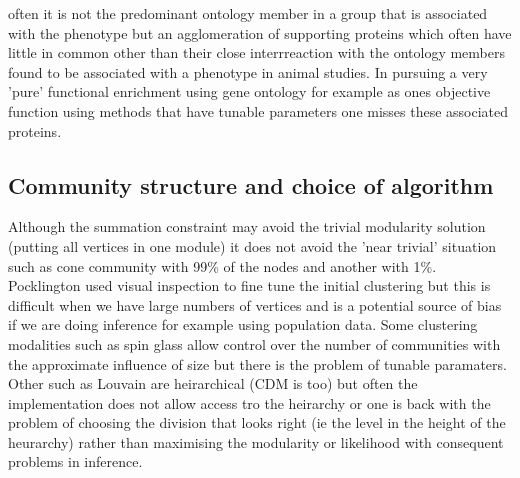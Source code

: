  often it is not the predominant ontology member in a group that is associated with the phenotype but an agglomeration of supporting proteins which often have little in common other than their close interrreaction with the ontology members found to be associated with a phenotype in animal studies. In pursuing a very 'pure' functional enrichment using gene ontology for example as ones objective function using methods that have tunable parameters one misses these associated proteins. 

\subsection{Community structure and choice of algorithm}

Although the summation constraint  may avoid the trivial modularity solution (putting all vertices in one module) it does not avoid the 'near trivial' situation such as cone community with 99\% of the nodes and another with 1\%. Pocklington used visual inspection to fine tune the initial clustering but this is difficult when we have large numbers of vertices and is a potential source of bias if we are doing inference for example using population data. Some clustering modalities such as spin glass allow control over the number of communities with the approximate influence of size but there is the problem of tunable paramaters. Other such as Louvain are heirarchical (CDM is too) but often the implementation does not allow access tro the heirarchy or one is back with the problem of choosing the division that looks right (ie the level in the height of the heurarchy) rather than maximising the modularity or likelihood with consequent problems in inference. 

